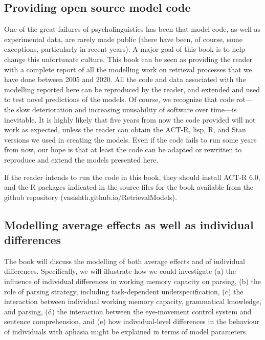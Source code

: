 \documentclass{cambridge7A}\usepackage[]{graphicx}\usepackage[]{color}
\begin{document}
\subsection{Providing open source model code}

One of the great failures of psycholinguistics has been that model code, as well as experimental data, are rarely made public (there have been, of course, some exceptions, particularly in recent years). A major goal of this book is to help change this unfortunate culture. This book can be seen as providing the reader with a complete report of all the modelling work on retrieval processes that we have done between 2005 and 2020. All the code and data associated with the modelling reported here can be reproduced by the reader, and extended and used to test novel predictions of the models. Of course, we recognize that code rot---the slow deterioration and increasing unusability of software over time---is inevitable. It is highly likely that five years from now the code provided will not work as expected, unless the reader can obtain the ACT-R, lisp, R, and Stan versions we used in creating the models. Even if  the code fails to run some years from now, our hope is that at least the code can be adapted or rewritten to reproduce and extend the models presented here.

If the reader intends to run the code in this book, they should install ACT-R 6.0, and the R packages indicated in the source files for the book available from the github repository (vasishth.github.io/RetrievalModels).



\subsection{Modelling average effects as well as individual differences}

The book will discuss the modelling of both average effects and of individual differences. Specifically, we will illustrate how we could investigate (a) 
the influence of individual differences in  working memory capacity on parsing, (b) the role of parsing strategy, including task-dependent underspecification,  (c) the interaction between individual working memory capacity, grammatical knowledge, and parsing, (d) the interaction between the eye-movement control system and sentence comprehension, and (e) how individual-level differences in the behaviour of individuals with aphasia might be explained in terms of model parameters. 
\end{document}
